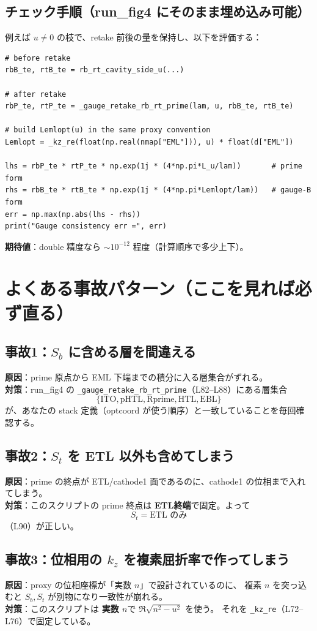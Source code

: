 \documentclass[a4paper,11pt]{article}
\begin{document}
\subsection{チェック手順（run\_fig4 にそのまま埋め込み可能）}
例えば \(u\neq 0\) の枝で、retake 前後の量を保持し、以下を評価する：

\begin{lstlisting}
# before retake
rbB_te, rtB_te = rb_rt_cavity_side_u(...)

# after retake
rbP_te, rtP_te = _gauge_retake_rb_rt_prime(lam, u, rbB_te, rtB_te)

# build Lemlopt(u) in the same proxy convention
Lemlopt = _kz_re(float(np.real(nmap["EML"])), u) * float(d["EML"])

lhs = rbP_te * rtP_te * np.exp(1j * (4*np.pi*L_u/lam))       # prime form
rhs = rbB_te * rtB_te * np.exp(1j * (4*np.pi*Lemlopt/lam))   # gauge-B form
err = np.max(np.abs(lhs - rhs))
print("Gauge consistency err =", err)
\end{lstlisting}

\noindent
\textbf{期待値}：double 精度なら \(\sim 10^{-12}\) 程度（計算順序で多少上下）。

\section{よくある事故パターン（ここを見れば必ず直る）}

\subsection*{事故1：\(S_b\) に含める層を間違える}
\textbf{原因}：prime 原点から EML 下端までの積分に入る層集合がずれる。\\
\textbf{対策}：run\_fig4 の \texttt{\_gauge\_retake\_rb\_rt\_prime}（L82--L88）にある層集合
\[
\{\mathrm{ITO,pHTL,Rprime,HTL,EBL}\}
\]
が、あなたの stack 定義（optcoord が使う順序）と一致していることを毎回確認する。

\subsection*{事故2：\(S_t\) を ETL 以外も含めてしまう}
\textbf{原因}：prime の終点が ETL/cathode1 面であるのに、cathode1 の位相まで入れてしまう。\\
\textbf{対策}：このスクリプトの prime 終点は \textbf{ETL終端}で固定。よって
\[
S_t=\text{ETL のみ}
\]
（L90）が正しい。

\subsection*{事故3：位相用の \(k_z\) を複素屈折率で作ってしまう}
\textbf{原因}：proxy の位相座標が「実数 \(n\)」で設計されているのに、
複素 \(n\) を突っ込むと \(S_b,S_t\) が別物になり一致性が崩れる。\\
\textbf{対策}：このスクリプトは \textbf{実数 \(n\)}で \(\Re\sqrt{n^2-u^2}\) を使う。
それを \texttt{\_kz\_re}（L72--L76）で固定している。
\end{document}

